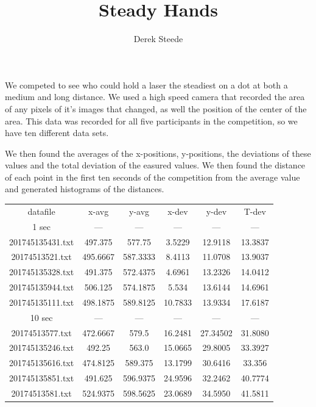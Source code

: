 \documentclass[10pt,letterpaper]{article}
\author{Derek Steede}
\title{Steady Hands}
\begin{document}
\maketitle

We competed to see who could hold a laser the steadiest on a dot at both a medium and long distance. We used a high speed camera that recorded the area of any pixels of it's images that changed, as well the position of the center of the area. This data was recorded for all five participants in the competition, so we have ten different data sets. 

\vline 

We then found the averages of the x-positions, y-positions, the deviations of these values and the total deviation of the easured values. We then found the distance of each point in the first ten seconds of the competition from the average value and generated histograms of the distances.

\begin{table}
\begin{tabular}{cccccc}
datafile & x-avg & y-avg & x-dev & y-dev & T-dev\\

1 sec & --- & --- & --- & --- & ---\\

201745135431.txt & 497.375 & 577.75 & 3.5229 & 12.9118 & 13.3837\\
20174513521.txt & 495.6667 & 587.3333 & 8.4113 & 11.0708 & 13.9037\\
201745135328.txt & 491.375 & 572.4375 & 4.6961 & 13.2326 & 14.0412\\
201745135944.txt & 506.125 & 574.1875 & 5.534 & 13.6144 & 14.6961\\
201745135111.txt & 498.1875 & 589.8125 & 10.7833 & 13.9334 & 17.6187\\

10 sec & --- & --- & --- & --- & ---\\

20174513577.txt & 472.6667 & 579.5 & 16.2481 & 27.34502 & 31.8080\\
201745135246.txt & 492.25 & 563.0 & 15.0665 & 29.8005 & 33.3927\\
201745135616.txt & 474.8125 & 589.375 & 13.1799 & 30.6416 & 33.356\\
201745135851.txt & 491.625 & 596.9375 & 24.9596 & 32.2462 & 40.7774\\
20174513581.txt & 524.9375 & 598.5625 & 23.0689 & 34.5950 & 41.5811\\

\end{tabular}
\end{table}
\end{document}
